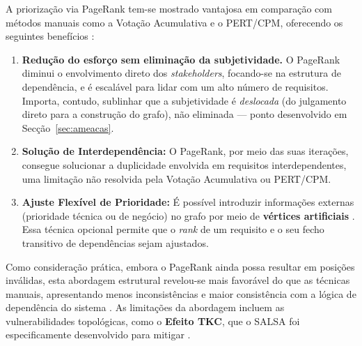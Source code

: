 A priorização via PageRank tem-se mostrado vantajosa em comparação
com métodos manuais como a Votação Acumulativa e o PERT/CPM,
oferecendo os seguintes benefícios \parencite{silva2018, he2014}:

\begin{enumerate}
    \item \textbf{Redução do esforço sem eliminação da subjetividade.}
        O PageRank diminui o envolvimento direto dos
        \emph{stakeholders}, focando-se na estrutura de dependência,
        e é escalável para lidar com um alto número de requisitos.
        Importa, contudo, sublinhar que a subjetividade é
        \emph{deslocada} (do julgamento direto para a construção do
        grafo), não eliminada --- ponto desenvolvido em
        Secção~\ref{sec:ameacas}.
    \item \textbf{Solução de Interdependência:} O PageRank, por meio
        das suas iterações, consegue solucionar a duplicidade
        envolvida em requisitos interdependentes, uma limitação não
        resolvida pela Votação Acumulativa ou PERT/CPM.
    \item \textbf{Ajuste Flexível de Prioridade:} É possível
        introduzir informações externas (prioridade técnica ou de
        negócio) no grafo por meio de \textbf{vértices artificiais}
        \parencite{silva2018}. Essa técnica opcional permite que o
        \emph{rank} de um requisito e o seu fecho transitivo de
        dependências sejam ajustados.
\end{enumerate}

Como consideração prática, embora o PageRank ainda possa resultar em
posições inválidas, esta abordagem estrutural revelou-se mais
favorável do que as técnicas manuais, apresentando menos
inconsistências e maior consistência com a lógica de dependência do
sistema \parencite{silva2018}. As limitações da abordagem incluem as
vulnerabilidades topológicas, como o \textbf{Efeito TKC}, que o SALSA
foi especificamente desenvolvido para mitigar \parencite{lempel2001}.
